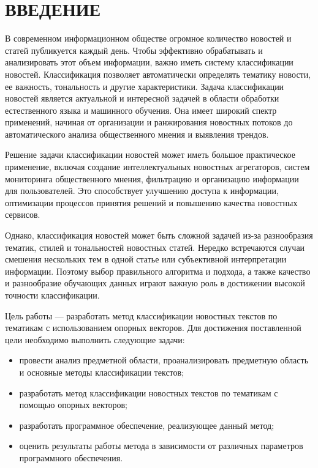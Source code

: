 \part*{ВВЕДЕНИЕ}
В современном информационном обществе огромное количество новостей и статей публикуется каждый день. Чтобы эффективно обрабатывать и анализировать этот объем информации, важно иметь систему классификации новостей. Классификация позволяет автоматически определять тематику новости, ее важность, тональность и другие характеристики. Задача классификации новостей является актуальной и интересной задачей в области обработки естественного языка и машинного обучения. Она имеет широкий спектр применений, начиная от организации и ранжирования новостных потоков до автоматического анализа общественного мнения и выявления трендов.

Решение задачи классификации новостей может иметь большое практическое применение, включая создание интеллектуальных новостных агрегаторов, систем мониторинга общественного мнения, фильтрацию и организацию информации для пользователей. Это способствует улучшению доступа к информации, оптимизации процессов принятия решений и повышению качества новостных сервисов.

Однако, классификация новостей может быть сложной задачей из-за разнообразия тематик, стилей и тональностей новостных статей. Нередко встречаются случаи смешения нескольких тем в одной статье или субъективной интерпретации информации. Поэтому выбор правильного алгоритма и подхода, а также качество и разнообразие обучающих данных играют важную роль в достижении высокой точности классификации.

Цель работы --- разработать метод классификации новостных текстов по тематикам с использованием опорных векторов. Для достижения поставленной цели необходимо выполнить следующие задачи:
\begin{itemize}[label = ---]
    \item провести анализ предметной области, проанализировать предметную область и основные методы классификации текстов;
    \item разработать метод классификации новостных текстов по тематикам с помощью опорных векторов;
    \item разработать программное обеспечение, реализующее данный метод;
    \item оценить результаты работы метода в зависимости от различных параметров программного обеспечения.
\end{itemize}